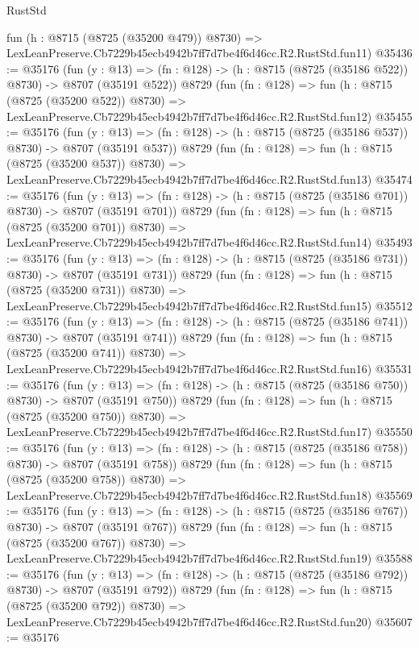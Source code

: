 \begin{lexlean}{RustStd}
\begin{coremodule}
    fun (h : @8715 (@8725 (@35200 @479)) @8730) =>
    LexLeanPreserve.Cb7229b45ecb4942b7ff7d7be4f6d46cc.R2.RustStd.fun11)
@35436 := @35176
    (fun (y : @13) => (fn : @128) -> (h : @8715 (@8725 (@35186 @522)) @8730) -> @8707 (@35191 @522))
    @8729
    (fun (fn : @128) =>
    fun (h : @8715 (@8725 (@35200 @522)) @8730) =>
    LexLeanPreserve.Cb7229b45ecb4942b7ff7d7be4f6d46cc.R2.RustStd.fun12)
@35455 := @35176
    (fun (y : @13) => (fn : @128) -> (h : @8715 (@8725 (@35186 @537)) @8730) -> @8707 (@35191 @537))
    @8729
    (fun (fn : @128) =>
    fun (h : @8715 (@8725 (@35200 @537)) @8730) =>
    LexLeanPreserve.Cb7229b45ecb4942b7ff7d7be4f6d46cc.R2.RustStd.fun13)
@35474 := @35176
    (fun (y : @13) => (fn : @128) -> (h : @8715 (@8725 (@35186 @701)) @8730) -> @8707 (@35191 @701))
    @8729
    (fun (fn : @128) =>
    fun (h : @8715 (@8725 (@35200 @701)) @8730) =>
    LexLeanPreserve.Cb7229b45ecb4942b7ff7d7be4f6d46cc.R2.RustStd.fun14)
@35493 := @35176
    (fun (y : @13) => (fn : @128) -> (h : @8715 (@8725 (@35186 @731)) @8730) -> @8707 (@35191 @731))
    @8729
    (fun (fn : @128) =>
    fun (h : @8715 (@8725 (@35200 @731)) @8730) =>
    LexLeanPreserve.Cb7229b45ecb4942b7ff7d7be4f6d46cc.R2.RustStd.fun15)
@35512 := @35176
    (fun (y : @13) => (fn : @128) -> (h : @8715 (@8725 (@35186 @741)) @8730) -> @8707 (@35191 @741))
    @8729
    (fun (fn : @128) =>
    fun (h : @8715 (@8725 (@35200 @741)) @8730) =>
    LexLeanPreserve.Cb7229b45ecb4942b7ff7d7be4f6d46cc.R2.RustStd.fun16)
@35531 := @35176
    (fun (y : @13) => (fn : @128) -> (h : @8715 (@8725 (@35186 @750)) @8730) -> @8707 (@35191 @750))
    @8729
    (fun (fn : @128) =>
    fun (h : @8715 (@8725 (@35200 @750)) @8730) =>
    LexLeanPreserve.Cb7229b45ecb4942b7ff7d7be4f6d46cc.R2.RustStd.fun17)
@35550 := @35176
    (fun (y : @13) => (fn : @128) -> (h : @8715 (@8725 (@35186 @758)) @8730) -> @8707 (@35191 @758))
    @8729
    (fun (fn : @128) =>
    fun (h : @8715 (@8725 (@35200 @758)) @8730) =>
    LexLeanPreserve.Cb7229b45ecb4942b7ff7d7be4f6d46cc.R2.RustStd.fun18)
@35569 := @35176
    (fun (y : @13) => (fn : @128) -> (h : @8715 (@8725 (@35186 @767)) @8730) -> @8707 (@35191 @767))
    @8729
    (fun (fn : @128) =>
    fun (h : @8715 (@8725 (@35200 @767)) @8730) =>
    LexLeanPreserve.Cb7229b45ecb4942b7ff7d7be4f6d46cc.R2.RustStd.fun19)
@35588 := @35176
    (fun (y : @13) => (fn : @128) -> (h : @8715 (@8725 (@35186 @792)) @8730) -> @8707 (@35191 @792))
    @8729
    (fun (fn : @128) =>
    fun (h : @8715 (@8725 (@35200 @792)) @8730) =>
    LexLeanPreserve.Cb7229b45ecb4942b7ff7d7be4f6d46cc.R2.RustStd.fun20)
@35607 := @35176

\end{coremodule}
\end{lexlean}
